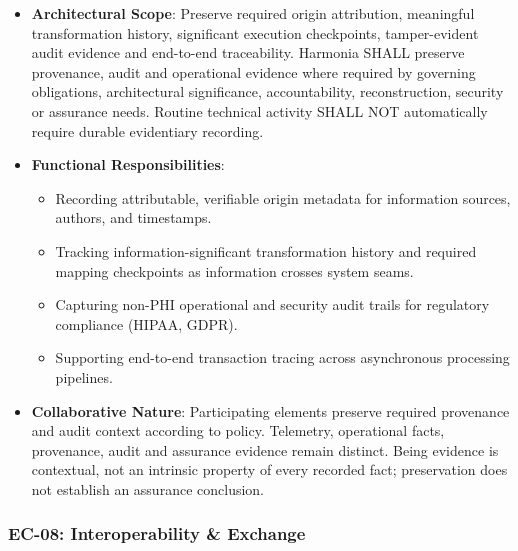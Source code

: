 \begin{itemize}

\item
\textbf{Architectural Scope}: Preserve required origin attribution, meaningful transformation history, significant execution checkpoints, tamper-evident audit evidence and end-to-end traceability. Harmonia SHALL preserve provenance, audit and operational evidence where required by governing obligations, architectural significance, accountability, reconstruction, security or assurance needs. Routine technical activity SHALL NOT automatically require durable evidentiary recording.



\item
\textbf{Functional Responsibilities}:


\begin{itemize}

\item
Recording attributable, verifiable origin metadata for information sources, authors, and timestamps.



\item
Tracking information-significant transformation history and required mapping checkpoints as information crosses system seams.



\item
Capturing non-PHI operational and security audit trails for regulatory compliance (HIPAA, GDPR).



\item
Supporting end-to-end transaction tracing across asynchronous processing pipelines.



\end{itemize}


\item
\textbf{Collaborative Nature}: Participating elements preserve required provenance and audit context according to policy. Telemetry, operational facts, provenance, audit and assurance evidence remain distinct. Being evidence is contextual, not an intrinsic property of every recorded fact; preservation does not establish an assurance conclusion.



\end{itemize}
\label{rad:enterprise:166}
\subsubsection*{EC-08: Interoperability \& Exchange}
\label{rad:enterprise:167}

